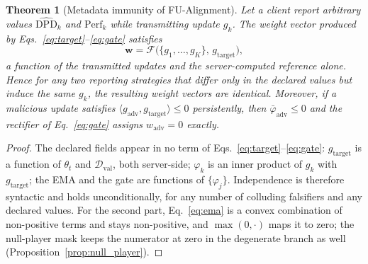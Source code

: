 \documentclass[preprint,12pt]{elsarticle}
\theoremstyle{plain}
\newtheorem{theorem}{Theorem}
\theoremstyle{definition}
\theoremstyle{remark}
\newcommand{\dpd}{\mathrm{DPD}}
\begin{document}
\begin{theorem}[Metadata immunity of FU-Alignment]\label{thm:metadata_immunity}
Let a client report arbitrary values $\widehat{\dpd}_k$ and $\mathrm{Perf}_k$ while transmitting update $g_k$. The weight vector produced by Eqs.~\eqref{eq:target}--\eqref{eq:gate} satisfies
\begin{equation}
\bm{w} = \mathcal{F}\big(\{g_1,\dots,g_K\},\, g_{\mathrm{target}}\big),
\end{equation}
a function of the transmitted updates and the server-computed reference alone. Hence for any two reporting strategies that differ only in the declared values but induce the same $g_k$, the resulting weight vectors are identical. Moreover, if a malicious update satisfies $\langle g_{\mathrm{adv}}, g_{\mathrm{target}}\rangle \le 0$ persistently, then $\bar{\varphi}_{\mathrm{adv}} \le 0$ and the rectifier of Eq.~\eqref{eq:gate} assigns $w_{\mathrm{adv}} = 0$ exactly.
\end{theorem}

\begin{proof}
The declared fields appear in no term of Eqs.~\eqref{eq:target}--\eqref{eq:gate}: $g_{\mathrm{target}}$ is a function of $\theta_t$ and $\mathcal{D}_{\mathrm{val}}$, both server-side; $\varphi_k$ is an inner product of $g_k$ with $g_{\mathrm{target}}$; the EMA and the gate are functions of $\{\varphi_j\}$. Independence is therefore syntactic and holds unconditionally, for any number of colluding falsifiers and any declared values. For the second part, Eq.~\eqref{eq:ema} is a convex combination of non-positive terms and stays non-positive, and $\max(0,\cdot)$ maps it to zero; the null-player mask keeps the numerator at zero in the degenerate branch as well (Proposition~\ref{prop:null_player}).
\end{proof}
\end{document}
